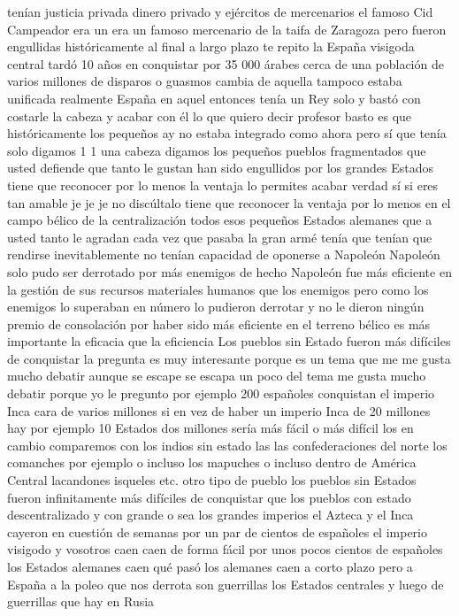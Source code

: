 tenían justicia privada dinero privado y ejércitos de mercenarios el famoso Cid Campeador era un
era un famoso mercenario de la taifa de Zaragoza pero fueron engullidas históricamente al final a largo plazo
te repito la España visigoda central tardó 10 años en conquistar por 35 000 árabes
cerca de una población de varios millones de disparos o guasmos cambia de aquella tampoco estaba unificada realmente España en aquel entonces
tenía un Rey solo y bastó con costarle la cabeza y acabar con él lo que quiero decir profesor basto
es que históricamente los pequeños ay no estaba integrado como ahora pero sí que tenía solo digamos 1 1
una cabeza digamos los pequeños pueblos fragmentados que usted defiende que tanto le gustan han sido engullidos por los grandes Estados
tiene que reconocer por lo menos la ventaja lo permites acabar verdad
sí si eres tan amable je je je no discúltalo tiene que reconocer la ventaja
por lo menos en el campo bélico de la centralización todos esos pequeños Estados alemanes
que a usted tanto le agradan cada vez que pasaba la gran armé tenía que tenían que rendirse inevitablemente no tenían capacidad de oponerse a Napoleón
Napoleón solo pudo ser derrotado por más enemigos de hecho Napoleón fue más eficiente en la gestión de sus recursos
materiales humanos que los enemigos pero como los enemigos lo superaban en número lo pudieron derrotar y no le dieron ningún premio de consolación
por haber sido más eficiente en el terreno bélico es más importante la eficacia que la eficiencia
Los pueblos sin Estado fueron más difíciles de conquistar
la pregunta es muy interesante porque es un tema que me me gusta mucho debatir aunque se escape se escapa un poco del tema
me gusta mucho debatir porque yo le pregunto por ejemplo 200 españoles conquistan el imperio Inca cara de varios millones
si en vez de haber un imperio Inca de 20 millones hay por ejemplo 10 Estados dos millones sería más fácil o más difícil
los en cambio comparemos con los indios sin estado las las confederaciones del norte los comanches por ejemplo
o incluso los mapuches o incluso dentro de América Central lacandones isqueles etc. otro tipo de pueblo
los pueblos sin Estados fueron infinitamente más difíciles de conquistar que los pueblos con estado descentralizado y con grande
o sea los grandes imperios el Azteca y el Inca cayeron en cuestión de semanas por un par de cientos de españoles el imperio visigodo y vosotros caen
caen de forma fácil por unos pocos cientos de españoles los Estados alemanes caen
qué pasó los alemanes caen a corto plazo
pero a España a la poleo que nos derrota son guerrillas los Estados centrales y luego de guerrillas que hay en Rusia
